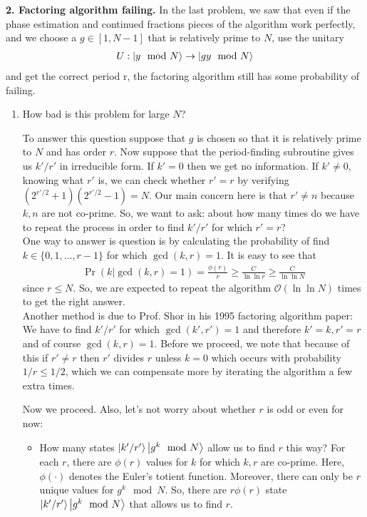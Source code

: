 \documentclass{article}
\theoremstyle{definition}
\newcommand{\f}[2]{\frac{#1}{#2}}
\begin{document}
\newpage

\noindent \textbf{2. Factoring algorithm failing.} In the last problem, we saw that even if the phase estimation and continued fractions pieces of the algorithm work perfectly, and we choose a  $g\in [1,N-1]$ that is relatively prime to $N$, use the unitary
\begin{align*}
U : \ket{ y \mod N}  \to \ket{gy \mod N}
\end{align*}
and get the correct period r, the factoring algorithm still has some probability of failing.

\begin{enumerate}[label=(\alph*)]

\item How bad is this problem for large $N$?

\noindent To answer this question suppose that $g$ is chosen so that it is relatively prime to $N$ and has order $r$. Now suppose that the period-finding subroutine gives us $k'/r'$ in irreducible form. If $k'=0$ then we get no information. If $k'\neq 0$, knowing what $r'$ is, we can check whether $r' = r$ by verifying $(2^{r'/2}+1)(2^{r'/2}-1) = N$. Our main concern here is that $r'\neq n$ because $k,n$ are not co-prime. So, we want to ask: about how many times do we have to repeat the process in order to find $k'/r'$ for which $r'=r$? \\



One way to answer is question is by calculating the probability of find $k\in \{ 0, 1,\dots, r-1 \}$ for which $\gcd(k,r) = 1$. It is easy to see that
\begin{align*}
	\Pr(k | \gcd(k,r) = 1) = \f{\phi(r)}{ r} \geq \f{C}{\ln \ln r} \geq \f{C}{\ln \ln N}
\end{align*}
since $r\leq N$. So, we are expected to repeat the algorithm $\mathcal{O}(\ln \ln N)$ times to get the right answer.\\

Another method is due to Prof. Shor in his 1995 factoring algorithm paper: We have to find $k'/r'$ for which $\gcd(k',r')=1$ and therefore $k'=k, r'=r$ and of course $\gcd(k,r) = 1$. Before we proceed, we note that because of this if $r'\neq r$ then $r'$ divides $r$ unless $k =0$ which occurs with probability $1/r \leq 1/2$, which we can compensate more by iterating the algorithm a few extra times. 

Now we proceed. Also, let's not worry about whether $r$ is odd or even for now:
\begin{itemize}
	\item How many states $\ket{k'/r'}\ket{g^k \mod N}$ allow us to find $r$ this way? For each $r$, there are $\phi(r)$ values for $k$ for which $k,r$ are co-prime. Here, $\phi(\cdot)$ denotes the Euler's totient function. Moreover, there can only be $r$ unique values for $g^k \mod N$. So, there are $r\phi(r)$ state $\ket{k'/r'}\ket{g^k \mod N}$ that allows us to find $r$.
	

\end{itemize}
\end{enumerate}
\end{document}
